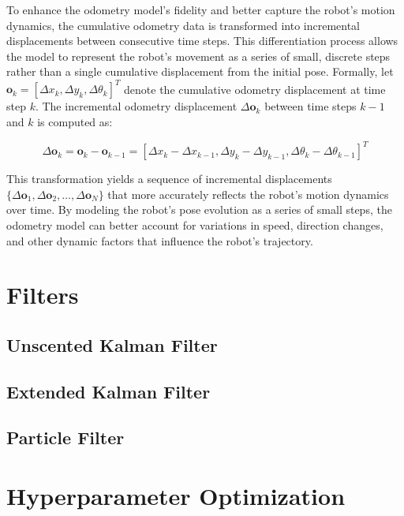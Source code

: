 \documentclass[conference]{IEEEtran}
\begin{document}
To enhance the odometry model's fidelity and better capture the robot's motion dynamics, the cumulative odometry data is transformed into incremental displacements between consecutive time steps. This differentiation process allows the model to represent the robot's movement as a series of small, discrete steps rather than a single cumulative displacement from the initial pose. Formally, let $\mathbf{o}_k = [\Delta x_k, \Delta y_k, \Delta \theta_k]^T$ denote the cumulative odometry displacement at time step $k$. The incremental odometry displacement $\Delta \mathbf{o}_k$ between time steps $k-1$ and $k$ is computed as:

\begin{equation}
    \Delta \mathbf{o}_k = \mathbf{o}_k - \mathbf{o}_{k-1} = [\Delta x_k - \Delta x_{k-1}, \Delta y_k - \Delta y_{k-1}, \Delta \theta_k - \Delta \theta_{k-1}]^T
\end{equation}

This transformation yields a sequence of incremental displacements $\{\Delta \mathbf{o}_1, \Delta \mathbf{o}_2, \ldots, \Delta \mathbf{o}_N\}$ that more accurately reflects the robot's motion dynamics over time. By modeling the robot's pose evolution as a series of small steps, the odometry model can better account for variations in speed, direction changes, and other dynamic factors that influence the robot's trajectory.



\section{Filters} \label{sec:filters}

\subsection{Unscented Kalman Filter} \label{sec:unscented_kalman_filter}

\subsection{Extended Kalman Filter} \label{sec:extended_kalman_filter}

\subsection{Particle Filter} \label{sec:particle_filter}

\section{Hyperparameter Optimization} \label{sec:hyperparameter_optimization}
\end{document}
